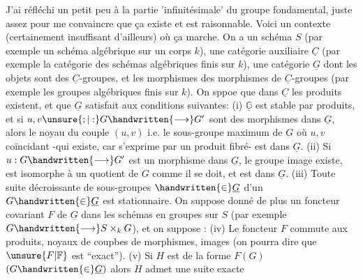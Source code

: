 J'ai réfléchi un petit peu à la partie 'infinitésimale' du groupe fondamental, juste assez pour me convaincre que ça existe et est raisonnable. Voici un contexte (certainement insuffisant d'ailleurs) où ça marche. On a un schéma $S$ (par exemple un schéma algébrique sur un corps $k$), une catégorie auxiliaire $\underline{C}$ (par exemple la catégorie des schémas algébriques finis sur $k$), une catégorie  $\underline{G}$ dont les objets sont des $\underline{C}$-groupes, et les morphismes des morphismes de $\underline{C}$-groupes (par exemple les groupes algébriques finis sur $k$). On sppoe que dans $\underline{C}$ les produits  existent, et que $\underline{G}$ satisfait aux conditions suivantes: (i) $\underline{\mathbb{G}}$ est stable par produits, et si $u,v\unsure{;|:}G\handwritten{\longrightarrow}G'$ sont des morphismes dans $\underline{G}$, alors le noyau du couple $(u,v)$ i.e. le sous-groupe  maximum de $G$ où $u,v$ coïncidant -qui existe, car s'exprime par un produit fibré- est dans $\underline{G}$. (ii) Si $u:G\handwritten{\longrightarrow}G'$ est un morphisme dans $\underline{G}$,  le groupe image existe, est isomorphe à un quotient de $G$ comme il se doit, et est dans $\underline{G}$. (iii) Toute suite décroissante de sous-groupes  $\handwritten{\in}\underline{G}$ d'un $G\handwritten{\in}\underline{G}$ est stationnaire. On suppose donné de plus un foncteur covariant  $F$ de $\underline{G}$ dans les  schémas en groupes sur $S$ (par exemple $G\handwritten{\longrightarrow}S\mathbin{\times}_{k}G$), et on suppose : (iv) Le foncteur $F$ commute aux produits,  noyaux de coupbes de morphismes, images (on pourra dire que $\unsure{F|\mathbb{F}}$ est ``exact''). (v) Si $H$ est  de la forme $F(G)$ $(G\handwritten{\in}\underline{G})$ alors $H$ admet une suite exacte


